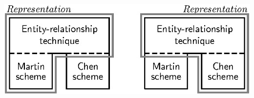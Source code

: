 \documentclass[oneside]{article}
\begin{document}
\begin{center}
\newpage

\mbox{}\vfill
	\includegraphics[width=20cm,keepaspectratio,angle=90]{MultipleSchemes}
\vfill\mbox{}
\end{center}
\end{document}
